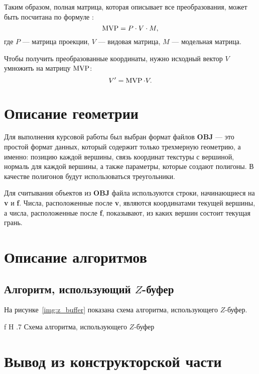 Таким образом, полная матрица, которая описывает все преобразования, может быть посчитана по формуле \cite{Jeremiah2011}:
\begin{equation}
\operatorname{MVP} = P \cdot V \cdot M,
\end{equation}
где $P$ --- матрица проекции, $V$ --- видовая матрица, $M$ --- модельная матрица.

Чтобы получить преобразованные координаты, нужно исходный вектор $V$ умножить на матрицу $\operatorname{MVP}$:
\begin{equation}
V' = \operatorname{MVP} \cdot V.
\end{equation}
    
\section{Описание геометрии}
\label{sec:geometry}

Для выполнения курсовой работы был выбран формат файлов \textbf{OBJ} --- это простой формат данных, который содержит только трехмерную геометрию, а именно: позицию каждой вершины, связь координат текстуры с вершиной, нормаль для каждой вершины, а также параметры, которые создают полигоны. 
В качестве полигонов будут использоваться треугольники.

Для считывания объектов из \textbf{OBJ} файла используются строки, начинающиеся на \textbf{v} и \textbf{f}. 
Числа, расположенные после \textbf{v}, являются координатами текущей вершины, а числа, расположенные после \textbf{f}, показывают, из каких вершин состоит текущая грань.

\section{Описание алгоритмов}

\subsection{Алгоритм, использующий $Z$-буфер}

На рисунке~\ref{img:z_buffer} показана схема алгоритма, использующего $Z$-буфер.

    {f}
    {H}
    {.7\textwidth}
    {Схема алгоритма, использующего $Z$-буфер}

\section*{Вывод из конструкторской части}

